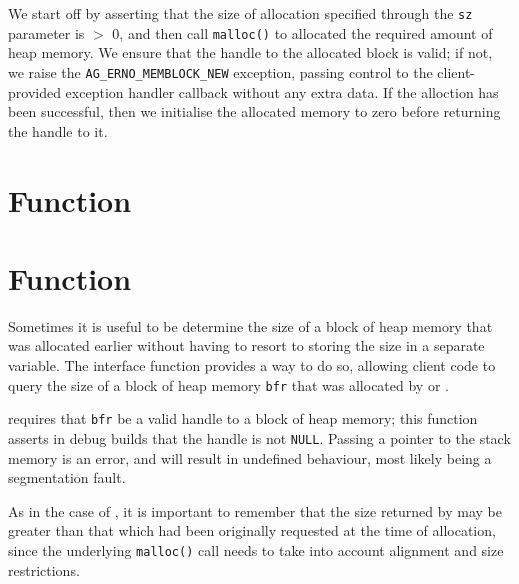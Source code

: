 We start off by asserting that the size of allocation specified through the
\verb|sz| parameter is $>$ 0, and then call \verb|malloc()| to allocated the
required amount of heap memory. We ensure that the handle to the allocated block
is valid; if not, we raise the \verb|AG_ERNO_MEMBLOCK_NEW| exception, passing
control to the client-provided exception handler callback without any extra
data. If the alloction has been successful, then we initialise the allocated
memory to zero before returning the handle to it.


%
%
\section{Function \agMemblockCopy}
\kant[1]
\kant[2]


%
%
\section{Function \agMemblockSz}

Sometimes it is useful to be determine the size of a block of heap memory that
was allocated earlier without having to resort to storing the size in a separate
variable. The interface function \agMemblockSz provides a way to do so, allowing
client code to query the size of a block of heap memory \verb|bfr| that was 
allocated by \agMemblockNew or \agMemblockCopy. 

\agMemblockSz requires that \verb|bfr| be a valid handle to a block of heap 
memory; this function asserts in debug builds that the handle is not 
\verb|NULL|. Passing a pointer to the stack memory is an error, and will result 
in undefined behaviour, most likely being a segmentation fault.

As in the case of \agMemblockNew, it is important to remember that the size
returned by \agMemblockSz may be greater than that which had been originally
requested at the time of allocation, since the underlying \verb|malloc()| call
needs to take into account alignment and size restrictions.

